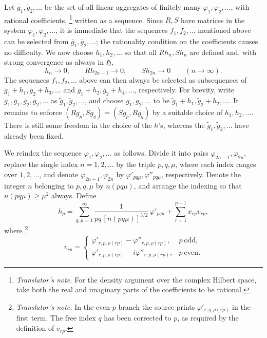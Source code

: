 \documentclass[
  paper=b5,
  twoside=true,
  fontsize=13pt,
  headings=normal,
  bookmarkpackage=false
]{scrartcl}
\theoremstyle{definition}
\newcounter{translatornote}
\newcounter{savedfootnote}
\newcommand{\TranslatorNote}[1]{%
  \stepcounter{translatornote}%
  \setcounter{savedfootnote}{\value{footnote}}%
  \begingroup
    \renewcommand{\thefootnote}{T\arabic{translatornote}}%
    \footnote{\textit{Translator's note.} #1}%
  \endgroup
  \setcounter{footnote}{\value{savedfootnote}}}
\begin{document}
Let \(\overline g_{1},\overline g_{2},\ldots\) be the set of all linear
aggregates of finitely many
\(\varphi_{1},\varphi_{2},\ldots\), with rational coefficients,\TranslatorNote{For
the density argument over the complex Hilbert space, take both the real
and imaginary parts of the coefficients to be rational.} written
as a sequence.  Since \(R,S\) have matrices in the system
\(\varphi_{1},\varphi_{2},\ldots\), it is immediate that the sequences
\(f_{1},f_{2},\ldots\) mentioned above can be selected from
\(\overline g_{1},\overline g_{2},\ldots\); the rationality condition on
the coefficients causes no difficulty.  We now choose
\(h_{1},h_{2},\ldots\) so that all \(Rh_n,Sh_n\) are defined and, with
strong convergence as always in \(\mathfrak H\),
\[
  h_n\longrightarrow0,\qquad
  Rh_{2n-1}\longrightarrow0,\qquad
  Sh_{2n}\longrightarrow0
  \qquad(n\to\infty).
\]
The sequences \(f_{1},f_{2},\ldots\) above can then always be selected
as subsequences of \(\overline g_{1}+h_{1},
\overline g_{2}+h_{3},\ldots\) and \(\overline g_{1}+h_{2},
\overline g_{2}+h_{4},\ldots\), respectively. For brevity, write
\(\overline g_{1},\overline g_{1},\overline g_{2},\overline g_{2},\ldots\)
as \(\widetilde g_{1},\widetilde g_{2},\ldots\), and choose
\(g_{1},g_{2},\ldots\) to be \(\widetilde g_{1}+h_{1},
\widetilde g_{2}+h_{2},\ldots\). It remains to enforce
\((Rg_p,Sg_q)=(Sg_p,Rg_q)\) by a suitable choice of \(h_{1},h_{2},\ldots\).
There is still some freedom in the choice of the \(h\)'s, whereas the
\(\widetilde g_{1},\widetilde g_{2},\ldots\) have already been fixed.

We reindex the sequence
\(\varphi_{1},\varphi_{2},\ldots\) as follows.  Divide it into pairs
\(\varphi_{2n-1},\varphi_{2n}\), replace the single index
\(n=1,2,\ldots\) by the triple \(p,q,\mu\), where each index ranges over
\(1,2,\ldots\), and denote \(\varphi_{2n-1},\varphi_{2n}\) by
\(\varphi'_{pq\mu},\varphi''_{pq\mu}\), respectively. Denote the integer
\(n\) belonging to \(p,q,\mu\) by \(n(pq\mu)\), and arrange the indexing
so that \(n(pq\mu)\geq\mu^{2}\) always.  Define
\[
  h_p
  =
  \sum_{q,\mu=1}^{\infty}
  \frac{1}{pq\,[n(pq\mu)]^{3/2}}\,\varphi'_{pq\mu}
  +
  \sum_{r=1}^{p-1}x_{rp}v_{rp},
\]
where\TranslatorNote{In the even-\(p\) branch the source prints
\(\varphi'_{r,q,\rho(rp)}\) in the first term.  The free index \(q\) has
been corrected to \(p\), as required by the definition of \(v_{rp}\).}
\[
  v_{rp}
  =
  \begin{cases}
    \varphi'_{r,p,\rho(rp)}-\varphi''_{r,p,\rho(rp)},
      &p\ \text{odd},\\
    \varphi'_{r,p,\rho(rp)}
      -i\varphi''_{r,p,\rho(rp)},
      &p\ \text{even}.
  \end{cases}
\]
\end{document}
